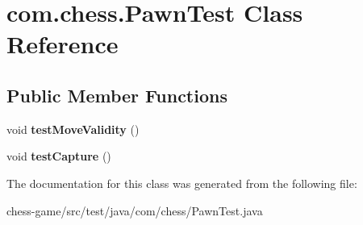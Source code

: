 \hypertarget{classcom_1_1chess_1_1_pawn_test}{}\section{com.\+chess.\+Pawn\+Test Class Reference}
\label{classcom_1_1chess_1_1_pawn_test}
\subsection*{Public Member Functions}
\begin{DoxyCompactItemize}
\item 
\mbox{\label{classcom_1_1chess_1_1_pawn_test_aeb172721907b22370d76cc5b3360c5ce}} 
void {\bfseries test\+Move\+Validity} ()
\item 
\mbox{\label{classcom_1_1chess_1_1_pawn_test_ae8fa112cb058a8cd199e972fb1ef1af8}} 
void {\bfseries test\+Capture} ()
\end{DoxyCompactItemize}


The documentation for this class was generated from the following file\+:\begin{DoxyCompactItemize}
\item 
chess-\/game/src/test/java/com/chess/Pawn\+Test.\+java\end{DoxyCompactItemize}
